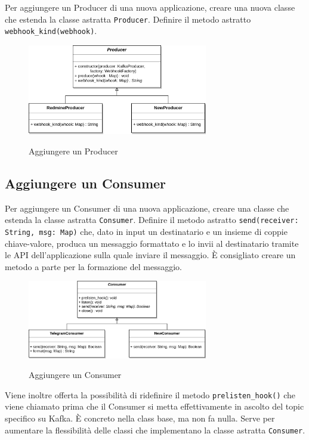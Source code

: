 Per aggiungere un Producer di una nuova applicazione, creare una nuova classe che estenda la classe astratta \texttt{Producer}.
Definire il metodo astratto \texttt{webhook\_kind(webhook)}.

\begin{figure}[H]
    \centering
    \includegraphics[width=0.7\textwidth]{img/EstensioneProducer.png}\\
    \caption{Aggiungere un Producer}
\end{figure}


\subsection{Aggiungere un Consumer}

Per aggiungere un Consumer di una nuova applicazione, creare una classe che estenda la classe astratta \texttt{Consumer}.
Definire il metodo astratto \texttt{send(receiver: String, msg: Map)} che, dato in input un destinatario e un insieme di coppie
chiave-valore, produca un messaggio formattato e lo invii al destinatario tramite le API dell'applicazione sulla quale inviare il messaggio.
È consigliato creare un metodo a parte per la formazione del messaggio.

\begin{figure}[H]
    \centering
    \includegraphics[width=0.7\textwidth]{img/EstensioneConsumer.png}\\
    \caption{Aggiungere un Consumer}
\end{figure}

Viene inoltre offerta la possibilità di ridefinire il metodo \texttt{prelisten\_hook()} che viene chiamato prima che il Consumer si metta effettivamente in ascolto
del topic specifico su Kafka.
È concreto nella class base, ma non fa nulla. Serve per aumentare la flessibilità delle classi che implementano la classe astratta \texttt{Consumer}.


